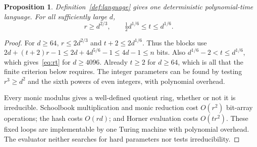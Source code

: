 \documentclass[11pt,letterpaper]{article}
\newtheorem{proposition}[theorem]{Proposition}
\theoremstyle{definition}
\numberwithin{equation}{section}
\begin{document}
\begin{proposition}\label{prop:polytime}
Definition~\ref{def:language} gives one deterministic polynomial-time
language. For all sufficiently large $d$,
\begin{equation}\label{eq:rt}
 r\ge d^{2/3},\qquad \tfrac12d^{1/6}\le t\le d^{1/6}.
\end{equation}
\end{proposition}
\begin{proof}
For $d\ge64$, $r\le2d^{2/3}$ and $t+2\le2d^{1/6}$. Thus the blocks use
$2d+(t+2)r-1\le2d+4d^{5/6}-1\le4d-1\le n$ bits.
Also $d^{1/6}-2<t\le d^{1/6}$, which gives~\eqref{eq:rt} for
$d\ge4096$. Already $t\ge2$ for $d\ge64$, which is all that the finite
criterion below requires. The integer parameters can be found by testing $r^3\ge d^2$
and the sixth powers of even integers, with polynomial overhead.

Every monic modulus gives a well-defined quotient ring, whether or not it
is irreducible. Schoolbook multiplication and monic reduction cost
$O(r^2)$ bit-array operations; the hash costs $O(rd)$; and Horner evaluation
costs $O(tr^2)$. These fixed loops are implementable by one Turing machine
with polynomial overhead. The evaluator neither searches for hard
parameters nor tests irreducibility.
\end{proof}
\end{document}

